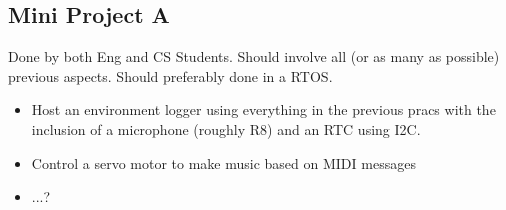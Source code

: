 \subsection{Mini Project A}
Done by both Eng and CS Students. Should involve all (or as many as possible) previous aspects. Should preferably done in a RTOS.
\begin{itemize}
    \item Host an environment logger using everything in the previous pracs with the inclusion of a microphone (roughly R8) and an RTC using I2C.
    \item Control a servo motor to make music based on MIDI messages
    \item ...?
\end{itemize}
